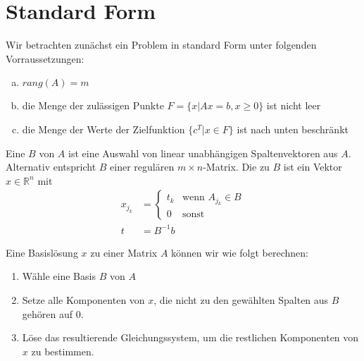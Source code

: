 \section{Standard Form}
Wir betrachten zunächst ein Problem in standard Form unter folgenden Vorraussetzungen:
\begin{enumerate}[(a)]
	\item $rang(A) = m$\label{vorr:a}
	\item die Menge der zulässigen Punkte $F = \{x| Ax=b, x\geq0\}$ ist nicht leer\label{vorr:b}
	\item die Menge der Werte der Zielfunktion $\{c^T|x \in F\}$ ist nach unten beschränkt\label{vorr:c}
\end{enumerate}
\begin{definition}
Eine  $B$ von $A$ ist eine Auswahl von linear unabhängigen Spaltenvektoren aus $A$. Alternativ entspricht $B$ einer regulären $m\times n$-Matrix.
Die  zu $B$ ist ein Vektor $x\in \mathbb R^n$ mit 
\begin{align*}
x_{j_k} &= \begin{cases}
t_k &\text{wenn }A_{j_k} \in B \\
0 &\text{sonst}
\end{cases}\\
t &= B^{-1}b
\end{align*}
\end{definition}

Eine Basislösung $x$ zu einer Matrix $A$ können wir wie folgt berechnen:
\begin{enumerate}
\item Wähle eine Basis $B$ von $A$
\item Setze alle Komponenten von $x$, die nicht zu den gewählten Spalten aus $B$ gehören auf $0$.
\item Löse das resultierende Gleichungssystem, um die restlichen Komponenten von $x$ zu bestimmen.
\end{enumerate}

